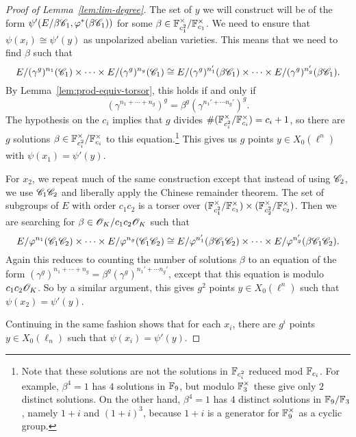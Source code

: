\documentclass{amsart}
\begin{document}
\begin{proof}[Proof of Lemma~\ref{lem:lim-degree}]
  The set of $y$ we will construct will be of the form $\psi'(E/\beta\mathscr{C}_1,\varphi^{\ast}(\beta\mathscr{C}_1))$ for some $\beta \in \mathbb{F}_{c_1^2}^\times/\mathbb{F}_{c_1}^\times$. We need to ensure that $\psi(x_i) \cong \psi'(y)$ as unpolarized abelian varieties. This means that we need to find $\beta$ such that
  \[
    E/(\gamma^g)^{n_1}(\mathscr{C}_1) \times \cdots \times E/(\gamma^g)^{n_g}(\mathscr{C}_1)
    \cong
    E/(\gamma^g)^{n_1'}(\beta\mathscr{C}_1) \times \cdots \times E/(\gamma^g)^{n_g'}(\beta\mathscr{C}_1).
  \]
  By Lemma~\ref{lem:prod-equiv-torsor}, this holds if and only if
  \[
    (\gamma^{n_1 + \cdots + n_g})^g = \beta^g(\gamma^{n_1' + \cdots n_g'})^g.
  \]
  The hypothesis on the $c_i$ implies that $g$ divides $\#(\mathbb{F}_{c_i^2}^\times/\mathbb{F}_{c_i}^\times) = c_i + 1$, so there are $g$ solutions $\beta \in \mathbb{F}_{c_i^2}^\times/\mathbb{F}_{c_i}^\times$ to this equation.\footnote{Note that these solutions are not the solutions in $\mathbb{F}_{c_i^2}$ reduced mod $\mathbb{F}_{c_i}$. For example, $\beta^4 = 1$ has $4$ solutions in $\mathbb{F}_9$, but modulo $\mathbb{F}_3^\times$ these give only $2$ distinct solutions. On the other hand, $\beta^4 = 1$ has $4$ distinct solutions in $\mathbb{F}_9/\mathbb{F}_3$, namely $1+i$ and $(1+i)^3$, because $1+i$ is a generator for $\mathbb{F}_9^\times$ as a cyclic group.} This gives us $g$ points $y \in X_0(\ell^n)$ with $\psi(x_1) = \psi'(y)$.

  For $x_2$, we repeat much of the same construction except that instead of using $\mathscr{C}_2$, we use $\mathscr{C}_1\mathscr{C}_2$ and liberally apply the Chinese remainder theorem. The set of subgroups of $E$ with order $c_1c_2$ is a torser over $(\mathbb{F}_{c_1^2}^\times/\mathbb{F}_{c_1}^\times) \times (\mathbb{F}_{c_2^2}^\times/\mathbb{F}_{c_2}^\times)$. Then we are searching for $\beta \in \mathscr{O}_K/c_1c_2\mathscr{O}_K$ such that
  \[
    E/\varphi^{n_1}(\mathscr{C}_1\mathscr{C}_2) \times \cdots \times E/\varphi^{n_g}(\mathscr{C}_1\mathscr{C}_2)
    \cong
    E/\varphi^{n_1'}(\beta\mathscr{C}_1\mathscr{C}_2) \times \cdots \times E/\varphi^{n_g'}(\beta\mathscr{C}_1\mathscr{C}_2).
  \]
  Again this reduces to counting the number of solutions $\beta$ to an equation of the form $(\gamma^{g})^{n_1 + \cdots + n_g} = \beta^g(\gamma^g)^{n_1' + \cdots n_g'}$, except that this equation is modulo $c_1c_2\mathscr{O}_K$. So by a similar argument, this gives $g^2$ points $y \in X_0(\ell^n)$ such that $\psi(x_2) = \psi'(y)$.

  Continuing in the same fashion shows that for each $x_i$, there are $g^i$ points $y \in X_0(\ell_n)$ such that $\psi(x_i) = \psi'(y)$.
\end{proof}
\end{document}

